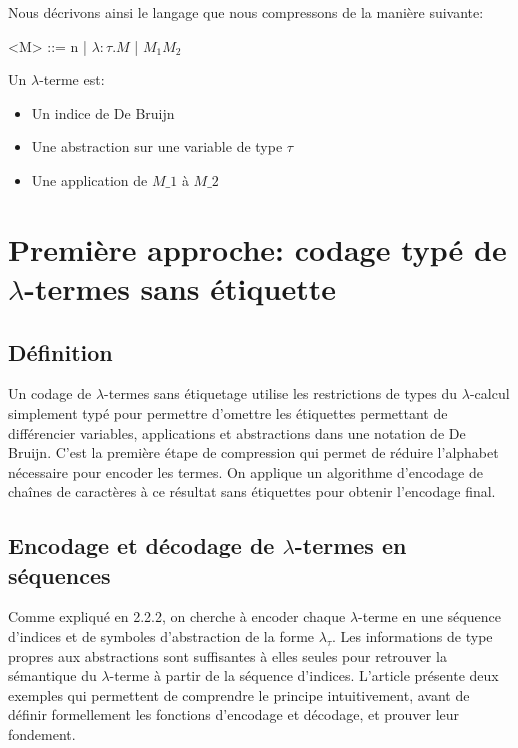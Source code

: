 \documentclass[titlepage]{article}
\providecommand{\tightlist}{%
  \setlength{\itemsep}{0pt}\setlength{\parskip}{0pt}}
\begin{document}
Nous décrivons ainsi le langage que nous compressons de la manière
suivante:

\begin{grammar}

\let\syntleft\relax
\let\syntright\relax

<M> ::= n
\alt    | $\lambda: \tau.M$
\alt    | $M_1 M_2$
\end{grammar}

Un \(\lambda\)-terme est:

\begin{itemize}
\tightlist
\item
  Un indice de De Bruijn
\item
  Une abstraction sur une variable de type \(\tau\)
\item
  Une application de $ M\_1 $ à $ M\_2 $
\end{itemize}

\section{Première approche: codage typé de $\lambda$-termes sans étiquette}\label{premiuxe8re-approche-codage-sans-uxe9tiquette-de-lambda-termes-basuxe9-sur-les-types}

\subsection{Définition}\label{duxe9finition}

Un codage de \(\lambda\)-termes sans étiquetage utilise les restrictions
de types du \(\lambda\)-calcul simplement typé pour permettre d'omettre
les étiquettes permettant de différencier variables, applications et
abstractions dans une notation de De Bruijn. C'est la première étape de
compression qui permet de réduire l'alphabet nécessaire pour encoder les
termes. On applique un algorithme d'encodage de chaînes de caractères à
ce résultat sans étiquettes pour obtenir l'encodage final.

\subsection{\texorpdfstring{Encodage et décodage de \(\lambda\)-termes
en
séquences}{Encodage et décodage de \(\lambda\)-termes en séquences}}\label{encodage-et-duxe9codage-de-lambda-termes-en-suxe9quences}

Comme expliqué en 2.2.2, on cherche à encoder chaque \(\lambda\)-terme
en une séquence d'indices et de symboles d'abstraction de la forme
\(\lambda_\tau\). Les informations de type propres aux abstractions sont
suffisantes à elles seules pour retrouver la sémantique du
\(\lambda\)-terme à partir de la séquence d'indices. L'article présente
deux exemples qui permettent de comprendre le principe intuitivement,
avant de définir formellement les fonctions d'encodage et décodage, et
prouver leur fondement.
\end{document}
